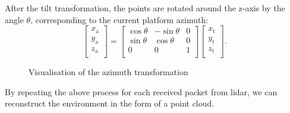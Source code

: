After the tilt transformation, the points are rotated around the z-axis by the angle $\theta$, corresponding to the current platform azimuth:
\begin{equation}
\begin{bmatrix}
    x_{\text{a}} \\
    y_{\text{a}} \\
    z_{\text{a}} \\
\end{bmatrix}
=
\begin{bmatrix}
    \cos \theta & -\sin \theta & 0 \\
    \sin \theta & \cos \theta & 0 \\
    0 & 0 & 1 \\
\end{bmatrix}
\begin{bmatrix}
    x_{\text{t}} \\
    y_{\text{t}} \\
    z_{\text{t}} \\
\end{bmatrix}.
\end{equation}
\begin{figure}[H]
    \centering
    
    \caption{Visualisation of the azimuth transformation}
\end{figure}
By repeating the above process for each received packet from \gls{lidar}, we can reconstruct the environment in the form of a point cloud.